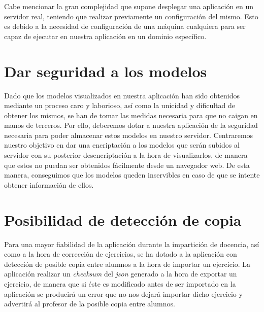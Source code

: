 Cabe mencionar la gran complejidad que supone desplegar una aplicación en un servidor real, teniendo que realizar previamente un configuración del mismo. Esto es debido a la necesidad de configuración de una máquina cualquiera para ser capaz de ejecutar en nuestra aplicación en un dominio específico.

\section{Dar seguridad a los modelos}
Dado que los modelos visualizados en nuestra aplicación han sido obtenidos mediante un proceso caro y laborioso, así como la unicidad y dificultad de obtener los mismos, se han de tomar las medidas necesaria para que no caigan en manos de terceros. Por ello, deberemos dotar a nuestra aplicación de la seguridad necesaria para poder almacenar estos modelos en nuestro servidor. Centraremos nuestro objetivo en dar una encriptación a los modelos que serán subidos al servidor con su posterior desencriptación a la hora de visualizarlos, de manera que estos no puedan ser obtenidos fácilmente desde un navegador web. De esta manera, conseguimos que los modelos queden inservibles en caso de que se intente obtener información de ellos.

\section{Posibilidad de detección de copia}
Para una mayor fiabilidad de la aplicación durante la impartición de docencia, así como a la hora de corrección de ejercicios, se ha dotado a la aplicación con detección de posible copia entre alumnos a la hora de importar un ejercicio. La aplicación realizar un \textit{checksum} del \textit{json} generado a la hora de exportar un ejercicio, de manera que si éste es modificado antes de ser importado en la aplicación se producirá un error que no nos dejará importar dicho ejercicio y advertirá al profesor de la posible copia entre alumnos.